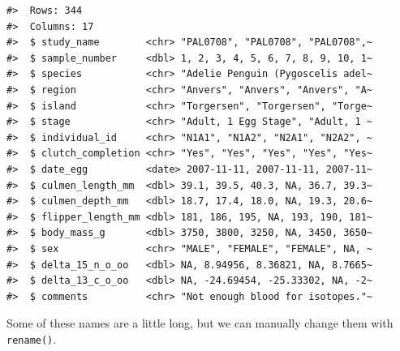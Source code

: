 \documentclass[letterpaper,9pt,twoside,]{pinp}
\begin{document}
\begin{ShadedResult}
\begin{verbatim}
#>  Rows: 344
#>  Columns: 17
#>  $ study_name        <chr> "PAL0708", "PAL0708", "PAL0708",~
#>  $ sample_number     <dbl> 1, 2, 3, 4, 5, 6, 7, 8, 9, 10, 1~
#>  $ species           <chr> "Adelie Penguin (Pygoscelis adel~
#>  $ region            <chr> "Anvers", "Anvers", "Anvers", "A~
#>  $ island            <chr> "Torgersen", "Torgersen", "Torge~
#>  $ stage             <chr> "Adult, 1 Egg Stage", "Adult, 1 ~
#>  $ individual_id     <chr> "N1A1", "N1A2", "N2A1", "N2A2", ~
#>  $ clutch_completion <chr> "Yes", "Yes", "Yes", "Yes", "Yes~
#>  $ date_egg          <date> 2007-11-11, 2007-11-11, 2007-11~
#>  $ culmen_length_mm  <dbl> 39.1, 39.5, 40.3, NA, 36.7, 39.3~
#>  $ culmen_depth_mm   <dbl> 18.7, 17.4, 18.0, NA, 19.3, 20.6~
#>  $ flipper_length_mm <dbl> 181, 186, 195, NA, 193, 190, 181~
#>  $ body_mass_g       <dbl> 3750, 3800, 3250, NA, 3450, 3650~
#>  $ sex               <chr> "MALE", "FEMALE", "FEMALE", NA, ~
#>  $ delta_15_n_o_oo   <dbl> NA, 8.94956, 8.36821, NA, 8.7665~
#>  $ delta_13_c_o_oo   <dbl> NA, -24.69454, -25.33302, NA, -2~
#>  $ comments          <chr> "Not enough blood for isotopes."~
\end{verbatim}
\end{ShadedResult}

Some of these names are a little long, but we can manually change them
with \texttt{rename()}.

\begin{Shaded}
\begin{Highlighting}[]
\OtherTok{\textless{}{-}}\SpecialCharTok{\%\textgreater{}\%} 
  \NormalTok{(}
\NormalTok{  )}
\end{Highlighting}
\end{Shaded}
\end{document}
